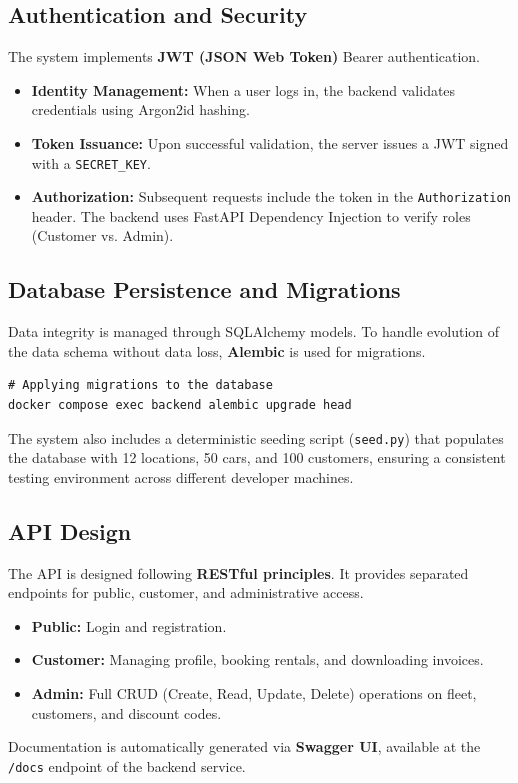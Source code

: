 \subsection{Authentication and Security}

The system implements \textbf{JWT (JSON Web Token)} Bearer authentication.
\begin{itemize}
    \item \textbf{Identity Management:} When a user logs in, the backend validates credentials using Argon2id hashing.
    \item \textbf{Token Issuance:} Upon successful validation, the server issues a JWT signed with a \texttt{SECRET\_KEY}.
    \item \textbf{Authorization:} Subsequent requests include the token in the \texttt{Authorization} header. The backend uses FastAPI Dependency Injection to verify roles (Customer vs. Admin).
\end{itemize}

\subsection{Database Persistence and Migrations}

Data integrity is managed through SQLAlchemy models. To handle evolution of the data schema without data loss, \textbf{Alembic} is used for migrations.

\begin{lstlisting}[style=pythonstyle, caption=Example of a Database Migration Command]
# Applying migrations to the database
docker compose exec backend alembic upgrade head
\end{lstlisting}

The system also includes a deterministic seeding script (\texttt{seed.py}) that populates the database with 12 locations, 50 cars, and 100 customers, ensuring a consistent testing environment across different developer machines.

\subsection{API Design}

The API is designed following \textbf{RESTful principles}. It provides separated endpoints for public, customer, and administrative access.

\begin{itemize}
    \item \textbf{Public:} Login and registration.
    \item \textbf{Customer:} Managing profile, booking rentals, and downloading invoices.
    \item \textbf{Admin:} Full CRUD (Create, Read, Update, Delete) operations on fleet, customers, and discount codes.
\end{itemize}

Documentation is automatically generated via \textbf{Swagger UI}, available at the \texttt{/docs} endpoint of the backend service.
